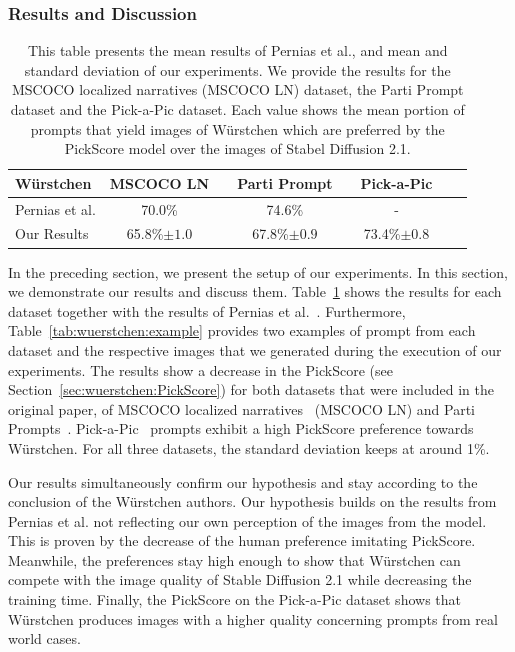 \subsubsection{Results and Discussion}
\begin{table}[t]
    \caption{This table presents the mean results of Pernias et
        al.\cite{pernias2024wrstchen}, and mean and standard deviation of our
        experiments. We provide the results for the MSCOCO localized narratives
        (MSCOCO LN) dataset, the Parti Prompt dataset and the Pick-a-Pic
        dataset. Each value shows the mean portion of prompts that yield images
        of W\"urstchen which are preferred by the PickScore model over the
        images of Stabel Diffusion 2.1.}
    \label{tab:wuerstchen:results}
    \centering
    \begin{tabular}{lccccccc}
        \toprule
        \textbf{W\"urstchen}                     & \textbf{MSCOCO LN}    & \phantom{0} & \textbf{Parti Prompt} & \phantom{0} & \textbf{Pick-a-Pic}   \\
        \midrule
        Pernias et al.\cite{pernias2024wrstchen} & 70.0\%                & \phantom{0} & 74.6\%                & \phantom{0} & -                     \\
        Our Results                              & 65.8\%{\tiny$\pm1.0$} & \phantom{0} & 67.8\%{\tiny$\pm0.9$} & \phantom{0} & 73.4\%{\tiny$\pm0.8$} \\
        \bottomrule
    \end{tabular}
\end{table}
In the preceding section, we present the setup of our experiments. In this
section, we demonstrate our results and discuss them.
Table~\ref{tab:wuerstchen:results} shows the results for each dataset together
with the results of Pernias et al.~\cite{pernias2024wrstchen}. Furthermore,
Table~\ref{tab:wuerstchen:example} provides two examples of prompt from each
dataset and the respective images that we generated during the execution of our
experiments. The results show a decrease in the PickScore (see
Section~\ref{sec:wuerstchen:PickScore}) for both datasets that were included in
the original paper, of MSCOCO localized
narratives~\cite{PontTuset2020LocalizedNarratives} (MSCOCO LN) and Parti
Prompts~\cite{yu2022scalingautoregressivemodelscontentrich}.
Pick-a-Pic~\cite{kirstain2023pickapic} prompts exhibit a high PickScore
preference towards W\"urstchen. For all three datasets, the standard deviation
keeps at around 1\%.

Our results simultaneously confirm our hypothesis and stay according to the
conclusion of the W\"urstchen authors. Our hypothesis builds on the results
from Pernias et al. not reflecting our own perception of the images from the
model. This is proven by the decrease of the human preference imitating
PickScore. Meanwhile, the preferences stay high enough to show that W\"urstchen can
compete with the image quality of Stable Diffusion 2.1 while decreasing the
training time. Finally, the PickScore on the Pick-a-Pic dataset shows that
W\"urstchen produces images with a higher quality concerning prompts from
real world cases.

